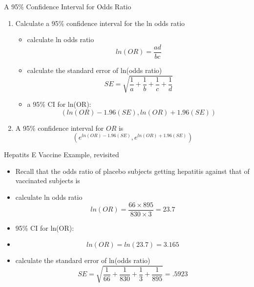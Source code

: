 \documentclass[14pt]{beamer}\usepackage[]{graphicx}\usepackage[]{color}
\begin{document}
\begin{frame}[fragile]{A 95\% Confidence Interval for Odds Ratio}

{\footnotesize{
\begin{enumerate}
\item<1-> Calculate a 95\% confidence interval for the ln odds ratio
  \begin{itemize}
  \item<2-> calculate ln odds ratio
    {\footnotesize{
    \begin{equation*}
    ln( OR) = \frac{ad}{bc}
    \end{equation*}
    }}
  \item<3-> calculate the standard error of ln(odds ratio)
    {\scriptsize{
    \begin{equation*}
    SE = \sqrt{\frac{1}{a} + \frac{1}{b} + \frac{1}{c} + \frac{1}{d} }
    \end{equation*}
    }}
  \item<4-> a 95\% CI for ln(OR):
    {\footnotesize{
    \begin{equation*}
      (ln(OR) - 1.96(SE), ln(OR) + 1.96(SE))
    \end{equation*}
    }}
  \end{itemize}

\item<5-> A 95\% confidence interval for $OR$ is
  {\footnotesize{
  \begin{equation*}
    (e^{ln(OR) - 1.96(SE)}, e^{ln(OR) + 1.96(SE)} )
  \end{equation*}
  }}
\end{enumerate}
}}
\end{frame}

\begin{frame}[fragile]{Hepatits E Vaccine Example, revisited}

{\small{
\begin{itemize}
  \item<1-> Recall that the odds ratio of placebo subjects getting hepatitis against that of vaccinated subjects is

  \item<2-> calculate ln odds ratio
    {\footnotesize{
    \begin{equation*}
    ln( OR) = \frac{66 \times 895}{830 \times 3} = 23.7
    \end{equation*}
    }}
  \item<3-> 95\% CI for ln(OR):
  \item<4->
    {\footnotesize{
    \begin{equation*}
      ln(OR) = ln(23.7) = 3.165
    \end{equation*}
    }}
    \item<5-> calculate the standard error of ln(odds ratio)
    {\footnotesize{
    \begin{equation*}
    SE = \sqrt{\frac{1}{66} + \frac{1}{830} + \frac{1}{3} + \frac{1}{895} } = .5923
    \end{equation*}
    }}
  \end{itemize}
}}
\end{frame}
\end{document}
